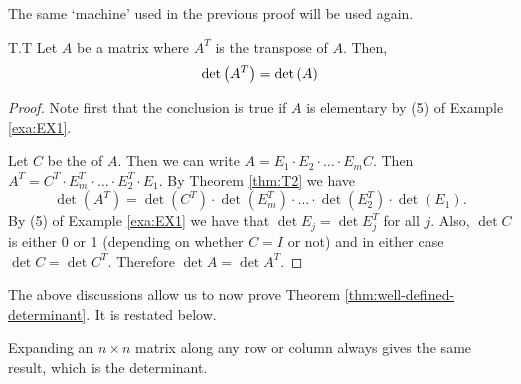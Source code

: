 The same `machine' used in the previous proof will be used again. 

\begin{theorem}{}{T.T} 
Let $A$ be a matrix where $A^T$ is the transpose of $A$. Then,
\begin{equation*}
\det\left(A^T\right) = \det \left(A \right)
\end{equation*}
\end{theorem} 

\begin{proof} 
Note first that the conclusion is true if $A$ is elementary by (5) of Example \ref{exa:EX1}. 

Let $C$ be the {\rref} of $A$. Then we can write 
$A= E_1\cdot E_2\cdot \dots\cdot E_m C$. 
Then $A^T=C^T\cdot E_m^T\cdot \dots \cdot E_2^T\cdot E_1$. 
By Theorem \ref{thm:T2} we have 
\[
\det (A^T)=\det (C^T)\cdot \det (E_m^T)\cdot \dots \cdot \det (E_2^T)\cdot \det(E_1).
\] 
By (5) of Example \ref{exa:EX1} we have that $\det E_j=\det E_j^T$ for all $j$. 
Also, $\det C$ is either 0 or 1 (depending on whether $C=I$ or not) and in either 
case $\det C=\det C^T$. Therefore $\det A=\det A^T$. 
\end{proof} 

The above discussions allow us to now prove Theorem \ref{thm:well-defined-determinant}. It is restated below. 
 
\begin{theorem}{}{}
Expanding an $n\times n$ matrix along any row or column always gives the same result, which is the determinant. 
\end{theorem} 


